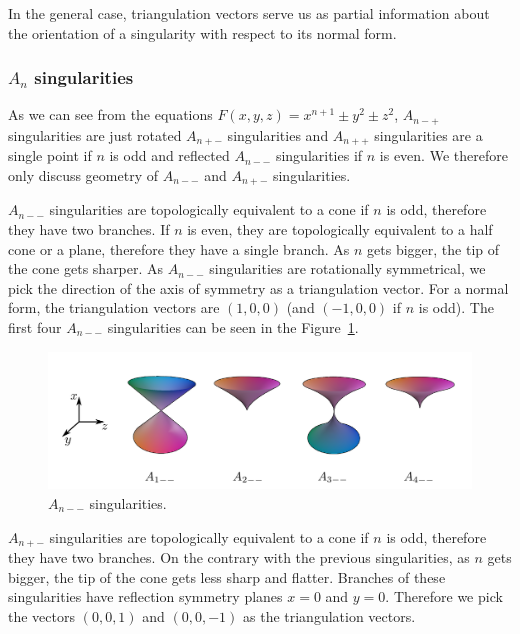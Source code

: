 In the general case, triangulation vectors serve us
as partial information about the orientation of a singularity with 
respect to its normal form.

\subsubsection*{$A_n$ singularities}

As we can see from the equations 
$F(x,y,z)=x^{n+1}\pm y^2\pm z^2$, $A_{n-+}$
singularities are just rotated $A_{n+-}$ singularities and $A_{n++}$ singularities 
are a single point if $n$ is odd and reflected $A_{n--}$ singularities if $n$ is even. 
We therefore only discuss geometry of $A_{n--}$ and $A_{n+-}$ singularities.

$A_{n--}$ singularities are topologically equivalent to a cone if $n$ is odd, therefore
they have two branches.
If $n$ is even, they are topologically equivalent to a half cone or a plane, therefore
they have a single branch.
As $n$ gets bigger, the tip of the cone gets sharper. As $A_{n--}$ singularities
are rotationally symmetrical, we pick the direction of
the axis of symmetry as a triangulation vector. For a normal form, the triangulation vectors
are $(1, 0, 0)$ (and $(-1, 0, 0)$ if $n$ is odd).
The first four $A_{n--}$ singularities can be seen in the Figure~\ref{img:4}.

\begin{figure}
    \centerline{\includegraphics[scale=0.5]{images/img4}}
    \caption[$A_{n--}$ singularities]
    {$A_{n--}$ singularities. \cite{morris2003client}}
    \label{img:4}
\end{figure}


$A_{n+-}$ singularities are topologically equivalent to a cone if $n$ is odd, therefore
they have two branches.
On the contrary with the previous singularities, as $n$ gets bigger, the tip
of the cone gets less sharp and flatter. Branches of these singularities have 
reflection symmetry planes $x=0$ and $y=0$. Therefore we pick the vectors
$(0, 0, 1)$ and $(0, 0, -1)$ as the triangulation vectors.

